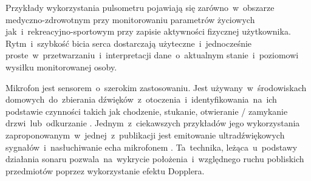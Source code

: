 Przykłady wykorzystania pulsometru pojawiają się zarówno~w~obszarze medyczno-zdrowotnym \cite{S62} przy monitorowaniu parametrów życiowych jak~i~rekreacyjno-sportowym \cite{S51} przy zapisie aktywności fizycznej użytkownika. Rytm~i~szybkość bicia serca dostarczają użyteczne~i~jednocześnie proste~w~przetwarzaniu~i~interpretacji dane~o~aktualnym stanie~i~poziomowi wysiłku monitorowanej osoby.

Mikrofon jest sensorem~o~szerokim zastosowaniu. Jest używany~w~środowiskach domowych~do~zbierania dźwięków~z~otoczenia~i~identyfikowania~na~ich podstawie czynności takich jak chodzenie, stukanie, otwieranie / zamykanie drzwi~lub~odkurzanie \cite{S46}. Jednym~z~ciekawszych przykładów jego wykorzystania zaproponowanym~w~jednej~z~publikacji jest emitowanie ultradźwiękowych sygnałów~i~nasłuchiwanie echa mikrofonem \cite{S22}. Ta~technika, leżąca~u~podstawy działania sonaru pozwala~na~wykrycie położenia~i~względnego ruchu pobliskich przedmiotów poprzez wykorzystanie efektu Dopplera.

